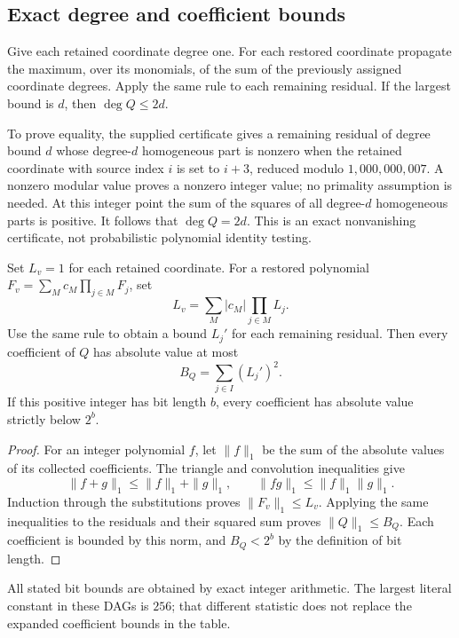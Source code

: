 \subsection{Exact degree and coefficient bounds}

Give each retained coordinate degree one.  For each restored coordinate
propagate the maximum, over its monomials, of the sum of the previously
assigned coordinate degrees.  Apply the same rule to each remaining
residual.  If the largest bound is $d$, then $\deg Q\le2d$.

To prove equality, the supplied certificate gives a remaining residual
of degree bound $d$ whose degree-$d$ homogeneous part is nonzero when
the retained coordinate with source index $i$ is set to $i+3$, reduced
modulo $1{,}000{,}000{,}007$.  A nonzero modular value proves a nonzero
integer value; no primality assumption is needed.  At this integer point
the sum of the squares of all degree-$d$ homogeneous parts is positive.
It follows that $\deg Q=2d$.  This is an exact nonvanishing certificate,
not probabilistic polynomial identity testing.

\begin{lemma}
\label{lem:monic-height}
Set $L_v=1$ for each retained coordinate.  For a restored polynomial
$F_v=\sum_M c_M\prod_{j\in M}F_j$, set
\[
 L_v=\sum_M |c_M|\prod_{j\in M}L_j.
\]
Use the same rule to obtain a bound $L_j'$ for each remaining residual.
Then every coefficient of $Q$ has absolute value at most
\[
 B_Q=\sum_{j\in I}(L_j')^2.
\]
If this positive integer has bit length $b$, every coefficient has
absolute value strictly below $2^b$.
\end{lemma}

\begin{proof}
For an integer polynomial $f$, let $\|f\|_1$ be the sum of the absolute
values of its collected coefficients.  The triangle and convolution
inequalities give
\[
 \|f+g\|_1\le\|f\|_1+\|g\|_1,
 \qquad \|fg\|_1\le\|f\|_1\|g\|_1.
\]
Induction through the substitutions proves $\|F_v\|_1\le L_v$.
Applying the same inequalities to the residuals and their squared sum
proves $\|Q\|_1\le B_Q$.  Each coefficient is bounded by this norm,
and $B_Q<2^b$ by the definition of bit length.
\end{proof}

All stated bit bounds are obtained by exact integer arithmetic.  The
largest literal constant in these DAGs is $256$; that different statistic
does not replace the expanded coefficient bounds in the table.

